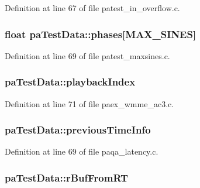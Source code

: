 Definition at line 67 of file patest\+\_\+in\+\_\+overflow.\+c.

\subsubsection[{\texorpdfstring{phases}{phases}}]{\setlength{\rightskip}{0pt plus 5cm}float pa\+Test\+Data\+::phases\mbox{[}{\bf M\+A\+X\+\_\+\+S\+I\+N\+ES}\mbox{]}}\hypertarget{structpa_test_data_aac0a533897183161c801e6714d9c15b9}{}\label{structpa_test_data_aac0a533897183161c801e6714d9c15b9}


Definition at line 69 of file patest\+\_\+maxsines.\+c.

\subsubsection[{\texorpdfstring{playback\+Index}{playbackIndex}}]{ pa\+Test\+Data\+::playback\+Index}\hypertarget{structpa_test_data_afe1f7fbbc358ba3e4ed51012544002b4}{}\label{structpa_test_data_afe1f7fbbc358ba3e4ed51012544002b4}


Definition at line 71 of file paex\+\_\+wmme\+\_\+ac3.\+c.

\subsubsection[{\texorpdfstring{previous\+Time\+Info}{previousTimeInfo}}]{ pa\+Test\+Data\+::previous\+Time\+Info}\hypertarget{structpa_test_data_a7b16cf9508f2d5bf94b8fdf60d3f903d}{}\label{structpa_test_data_a7b16cf9508f2d5bf94b8fdf60d3f903d}


Definition at line 69 of file paqa\+\_\+latency.\+c.

\subsubsection[{\texorpdfstring{r\+Buf\+From\+RT}{rBufFromRT}}]{ pa\+Test\+Data\+::r\+Buf\+From\+RT}\hypertarget{structpa_test_data_a0d1af2a9de18eb7e1283aab8596b8c72}{}\label{structpa_test_data_a0d1af2a9de18eb7e1283aab8596b8c72}


